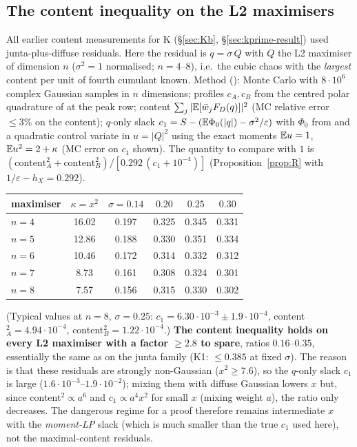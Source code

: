 \subsection{The content inequality on the L2 maximisers}\label{sec:kcontent}
All earlier content measurements for K (\S\ref{sec:Kb}, \S\ref{sec:kprime-result}) used junta-plus-diffuse residuals. Here the residual is $q=\sigma\,Q$ with $Q$ the L2 maximiser of
dimension $n$ ($\sigma^2=1$ normalised; $n=4$--$8$), i.e.\ the cubic chaos with the \emph{largest} content per unit of fourth cumulant known. Method (): Monte Carlo
with $8\cdot10^6$ complex Gaussian samples in $n$ dimensions; profiles $c_A,c_B$ from the centred polar quadrature of  at the peak row; content
$\sum_j|\mathbb E[\bar w_jF_D(q)]|^2$ (MC relative error $\le3\%$ on the content); $q$-only slack $c_1=S-(\mathbb E\Phi_0(|q|)-\sigma^2/\varepsilon)$ with $\Phi_0$ from  and a
quadratic control variate in $u=|Q|^2$ using the exact moments $\mathbb E u=1$, $\mathbb E u^2=2+\kappa$ (MC error on $c_1$ shown). The quantity to compare with $1$ is
$(\text{content}_A^2+\text{content}_B^2)/[0.292\,(c_1+10^{-4})]$ (Proposition~\ref{prop:R} with $1/\varepsilon-h_X=0.292$).
\begin{center}\small
\begin{tabular}{lc|cccc}\toprule
maximiser & $\kappa=x^2$ & $\sigma=0.14$ & $0.20$ & $0.25$ & $0.30$\\\midrule
$n=4$ & 16.02 & 0.197 & 0.325 & 0.345 & 0.331\\
$n=5$ & 12.86 & 0.188 & 0.330 & 0.351 & 0.334\\
$n=6$ & 10.46 & 0.172 & 0.314 & 0.332 & 0.312\\
$n=7$ & 8.73 & 0.161 & 0.308 & 0.324 & 0.301\\
$n=8$ & 7.57 & 0.156 & 0.315 & 0.330 & 0.302\\\bottomrule
\end{tabular}
\end{center}
(Typical values at $n=8$, $\sigma=0.25$: $c_1=6.30\cdot10^{-3}\pm1.9\cdot10^{-4}$, content$_A^2=4.94\cdot10^{-4}$, content$_B^2=1.22\cdot10^{-4}$.) \textbf{The content inequality holds on
every L2 maximiser with a factor $\ge2.8$ to spare}, ratios $0.16$--$0.35$, essentially the same as on the junta family (K1: $\le0.385$ at fixed $\sigma$). The reason is that these
residuals are strongly non-Gaussian ($x^2\ge7.6$), so the $q$-only slack $c_1$ is large ($1.6\cdot10^{-3}$--$1.9\cdot10^{-2}$); mixing them with diffuse Gaussian lowers $x$ but, since
content$^2\propto a^6$ and $c_1\propto a^4x^2$ for small $x$ (mixing weight $a$), the ratio only decreases. The dangerous regime for a proof therefore remains intermediate $x$ with the
\emph{moment-LP} slack (which is much smaller than the true $c_1$ used here), not the maximal-content residuals.

